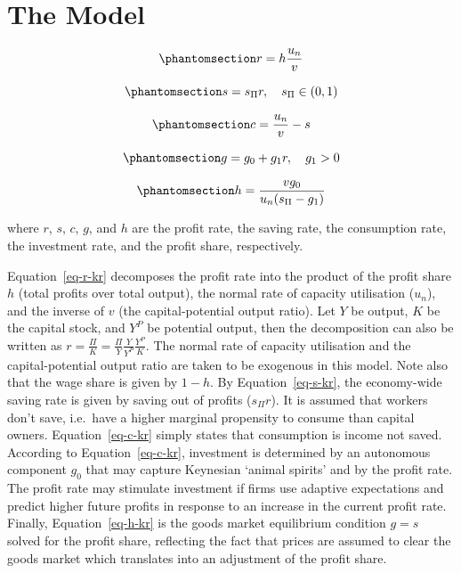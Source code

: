 \documentclass[
  letterpaper,
  DIV=11,
  numbers=noendperiod]{scrreprt}
\begin{document}
\section{The Model}\label{the-model-4}

\begin{equation}\phantomsection\label{eq-r-kr}{
r=h \frac{u_n}{v}
}\end{equation}

\begin{equation}\phantomsection\label{eq-s-kr}{
s=s_\Pi r,  \quad  s_\Pi \in (0,1)
}\end{equation}

\begin{equation}\phantomsection\label{eq-c-kr}{
c= \frac{u_n}{v}-s
}\end{equation}

\begin{equation}\phantomsection\label{eq-g-kr}{
g=g_0+g_1r, \quad g_1 > 0
}\end{equation}

\begin{equation}\phantomsection\label{eq-h-kr}{
h=\frac{vg_0}{u_n(s_\Pi-g_1)}
}\end{equation}

where \(r\), \(s\), \(c\), \(g\), and \(h\) are the profit rate, the
saving rate, the consumption rate, the investment rate, and the profit
share, respectively.

Equation~\ref{eq-r-kr} decomposes the profit rate into the product of
the profit share \(h\) (total profits over total output), the normal
rate of capacity utilisation (\(u_n\)), and the inverse of \(v\) (the
capital-potential output ratio). Let \(Y\) be output, \(K\) be the
capital stock, and \(Y^P\) be potential output, then the decomposition
can also be written as
\(r=\frac{\Pi}{K}=\frac{\Pi}{Y}\frac{Y}{Y^P}\frac{Y^P}{K}\). The normal
rate of capacity utilisation and the capital-potential output ratio are
taken to be exogenous in this model. Note also that the wage share is
given by \(1-h\). By Equation~\ref{eq-s-kr}, the economy-wide saving
rate is given by saving out of profits (\(s_\Pi r\)). It is assumed that
workers don't save, i.e.~have a higher marginal propensity to consume
than capital owners. Equation~\ref{eq-c-kr} simply states that
consumption is income not saved. According to Equation~\ref{eq-c-kr},
investment is determined by an autonomous component \(g_0\) that may
capture Keynesian `animal spirits' and by the profit rate. The profit
rate may stimulate investment if firms use adaptive expectations and
predict higher future profits in response to an increase in the current
profit rate. Finally, Equation~\ref{eq-h-kr} is the goods market
equilibrium condition \(g=s\) solved for the profit share, reflecting
the fact that prices are assumed to clear the goods market which
translates into an adjustment of the profit share.
\end{document}
